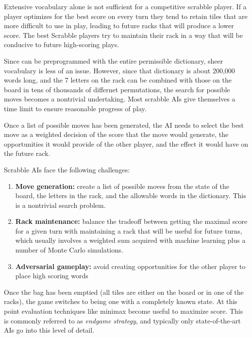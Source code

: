 \documentclass[12pt]{article}
\begin{document}
Extensive vocabulary alone is not sufficient for a competitive scrabble player. If a player optimizes for the
best score on every turn they tend to retain tiles that are more
difficult to use in play, leading to future racks that will produce a
lower score. The best Scrabble players try to maintain their rack in a
way that will be conducive to future high-scoring plays.

Since can be preprogrammed with the entire permissible
dictionary, sheer vocabulary is less of an issue. However, since that dictionary is
about 200,000 words long, and the 7 letters on the rack can be combined with those on the board in tens of thousands of differnet permutations, the search for possible moves
becomes a nontrivial undertaking. Most scrabble AIs give
themselves a time limit to ensure reasonable progress of play.

Once a list of possible moves has been generated, the AI needs to select
the best move as a weighted decision of the score that the
move would generate, the opportunities it would provide of the other
player, and the effect it would have on the future rack.

Scrabble AIs face the following challenges:

\begin{enumerate}
  \item \textbf{Move generation:} create a list of possible moves from
    the state of the board, the letters in the rack, and the allowable
    words in the dictionary. This is a nontrivial search problem.
    
  \item \textbf{Rack maintenance:} balance the tradeoff between getting
    the maximal score for a given turn with maintaining a rack that
    will be useful for future turns, which usually involves a weighted
    sum acquired with machine learning plus a number of Monte Carlo
    simulations.
    
  \item \textbf{Adversarial gameplay:} avoid creating opportunities
    for the other player to place high scoring words 
\end{enumerate}

Once the bag has been emptied (all tiles are either on the board or in
one of the racks), the game switches to being one with a completely
known state. At this point evaluation techniques like minimax become
useful to maximize score. This is commonly referred to as
\emph{endgame strategy}, and typically only state-of-the-art AIs go
into this level of detail.
\end{document}
